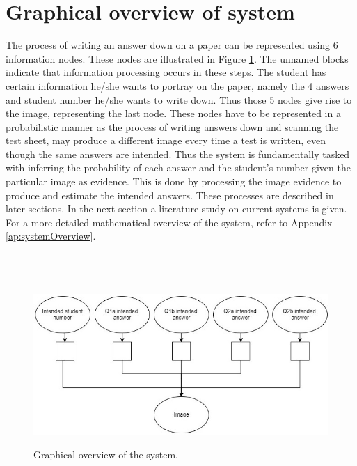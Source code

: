 \section{Graphical overview of system}
The process of writing an answer down on a paper can be represented using 6 information nodes. These nodes are illustrated in Figure \ref{fig:systemOverviewIntro}. The unnamed blocks indicate that information processing occurs in these steps. The student has certain information he/she wants to portray on the paper, namely the 4 answers and student number he/she wants to write down. Thus those 5 nodes give rise to the image, representing the last node. These nodes have to be represented in a probabilistic manner as the process of writing answers down and scanning the test sheet, may produce a different image every time a test is written, even though the same answers are intended. Thus the system is fundamentally tasked with inferring the probability of each answer and the student's number given the particular image as evidence. This is done by processing the image evidence to produce and estimate the intended answers. These processes are described in later sections. In the next section a literature study on current systems is given. For a more detailed mathematical overview of the system, refer to Appendix \ref{ap:systemOverview}.
\\
\\
\\
\\
\begin{figure}[H]
  \centering
  \includegraphics[width=13cm]{systemOverview}\\
  \caption{Graphical overview of the system.}
  \label{fig:systemOverviewIntro}
\end{figure}